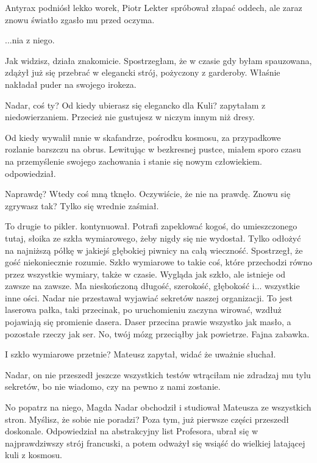 \divider{}

Antyrax podniósł lekko worek, Piotr Lekter spróbował złapać oddech, ale zaraz znowu światło zgasło mu przed oczyma.

\divider{}

...nia z niego. \de{}

\ds{} Jak widzisz, działa znakomicie. \dm{} Spostrzegłam, że w czasie gdy byłam spauzowana, zdążył już się przebrać w elegancki strój, pożyczony z garderoby. Właśnie nakładał puder na swojego irokeza. \de{}

\ds{} Nadar, coś ty? Od kiedy ubierasz się elegancko dla Kuli? \dm{} zapytałam z niedowierzaniem. \dm{} Przecież nie gustujesz w niczym innym niż dresy. \de{}

\ds{} Od kiedy wywalił mnie w skafandrze, pośrodku kosmosu, za przypadkowe rozlanie barszczu na obrus. 
Lewitując w bezkresnej pustce, miałem sporo czasu na przemyślenie swojego zachowania i stanie się nowym człowiekiem. \dm{} odpowiedział. \de{}

\ds{} Naprawdę? \dm{} Wtedy coś mną tknęło. \dm{} Oczywiście, że nie na prawdę. Znowu się zgrywasz tak? \dm{} Tylko się wrednie zaśmiał. \de{}

\ds{} To drugie to pikler. \dm{} kontynuował. \dm{} Potrafi zapeklować kogoś, do umieszczonego tutaj, słoika ze szkła wymiarowego, żeby nigdy się nie wydostał.
Tylko odłożyć na najniższą półkę w jakiejś głębokiej piwnicy na całą wieczność.
\dm{} Spostrzegł, że gość niekoniecznie rozumie. \dm{}
Szkło wymiarowe to takie coś, które przechodzi równo przez wszystkie wymiary, także w czasie. Wygląda jak szkło, ale istnieje od zawsze na zawsze. Ma nieskończoną długość, szerokość,
głębokość i... wszystkie inne ości. \dm{}
Nadar nie przestawał wyjawiać sekretów naszej organizacji. \dm{}
To jest laserowa pałka, taki przecinak, po uruchomieniu zaczyna wirować, wzdłuż pojawiają się promienie dasera. Daser przecina prawie wszystko jak masło,
a pozostałe rzeczy jak ser. No, twój mózg przeciąłby jak powietrze.
Fajna zabawka. \de{}

\ds{} I szkło wymiarowe przetnie? \ds{} Mateusz zapytał, widać że uważnie słuchał. \de{}

\ds{} Nadar, on nie przeszedł jeszcze wszystkich testów \dm{} wtrąciłam \dm{} nie zdradzaj mu tylu sekretów, bo nie wiadomo, czy na pewno z nami zostanie.

\ds{} No popatrz na niego, Magda \dm{} Nadar obchodził i studiował Mateusza ze wszystkich stron. \dm{} Myślisz, że sobie nie poradzi?
Poza tym, już pierwsze części przeszedł doskonale. Odpowiedział na abstrakcyjny list Profesora, ubrał się w najprawdziwszy strój francuski, a potem 
odważył się wsiąść do wielkiej latającej kuli z kosmosu. \de{}

